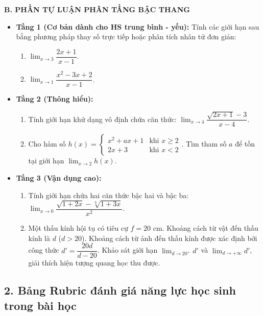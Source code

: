 \documentclass[12pt, a4paper]{article}
\begin{document}
\noindent \textbf{B. PHẦN TỰ LUẬN PHÂN TẦNG BẬC THANG}
\begin{itemize}[leftmargin=0.6cm]
    \item \textbf{Tầng 1 (Cơ bản dành cho HS trung bình - yếu):}
    Tính các giới hạn sau bằng phương pháp thay số trực tiếp hoặc phân tích nhân tử đơn giản:
    \begin{enumerate}[leftmargin=0.5cm]
        \item $\lim_{x \to 3} \dfrac{2x + 1}{x - 1}$.
        \item $\lim_{x \to 1} \dfrac{x^2 - 3x + 2}{x - 1}$.
    \end{enumerate}

    \item \textbf{Tầng 2 (Thông hiểu):}
    \begin{enumerate}[leftmargin=0.5cm]
        \item Tính giới hạn khử dạng vô định chứa căn thức: $\lim_{x \to 4} \dfrac{\sqrt{2x + 1} - 3}{x - 4}$.
        \item Cho hàm số $h(x) = \begin{cases} x^2 + ax + 1 & \text{khi } x \ge 2 \\ 2x + 3 & \text{khi } x < 2 \end{cases}$. Tìm tham số $a$ để tồn tại giới hạn $\lim_{x \to 2} h(x)$.
    \end{enumerate}

    \item \textbf{Tầng 3 (Vận dụng cao):}
    \begin{enumerate}[leftmargin=0.5cm]
        \item Tính giới hạn chứa hai căn thức bậc hai và bậc ba: $\lim_{x \to 0} \dfrac{\sqrt{1 + 2x} - \sqrt[3]{1 + 3x}}{x^2}$.
        \item Một thấu kính hội tụ có tiêu cự $f = 20\text{ cm}$. Khoảng cách từ vật đến thấu kính là $d$ ($d > 20$). Khoảng cách từ ảnh đến thấu kính được xác định bởi công thức $d' = \dfrac{20d}{d - 20}$. Khảo sát giới hạn $\lim_{d \to 20^+} d'$ và $\lim_{d \to +\infty} d'$, giải thích hiện tượng quang học thu được.
    \end{enumerate}
\end{itemize}

\subsection*{2. Bảng Rubric đánh giá năng lực học sinh trong bài học}
\end{document}
